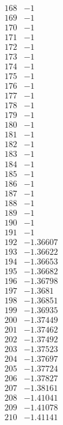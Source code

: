 \documentclass[12pt]{article}
\begin{document}
{$$\begin{array}{|r|r|}
\hline
168 & -1\\
\hline
169 & -1\\
\hline
170 & -1\\
\hline
171 & -1\\
\hline
172 & -1\\
\hline
173 & -1\\
\hline
174 & -1\\
\hline
175 & -1\\
\hline
176 & -1\\
\hline
177 & -1\\
\hline
178 & -1\\
\hline
179 & -1\\
\hline
180 & -1\\
\hline
181 & -1\\
\hline
182 & -1\\
\hline
183 & -1\\
\hline
184 & -1\\
\hline
185 & -1\\
\hline
186 & -1\\
\hline
187 & -1\\
\hline
188 & -1\\
\hline
189 & -1\\
\hline
190 & -1\\
\hline
191 & -1\\
\hline
192 & -1.36607\\
\hline
193 & -1.36622\\
\hline
194 & -1.36653\\
\hline
195 & -1.36682\\
\hline
196 & -1.36798\\
\hline
197 & -1.3681\\
\hline
198 & -1.36851\\
\hline
199 & -1.36935\\
\hline
200 & -1.37449\\
\hline
201 & -1.37462\\
\hline
202 & -1.37492\\
\hline
203 & -1.37523\\
\hline
204 & -1.37697\\
\hline
205 & -1.37724\\
\hline
206 & -1.37827\\
\hline
207 & -1.38161\\
\hline
208 & -1.41041\\
\hline
209 & -1.41078\\
\hline
210 & -1.41141\\

\end{array}$$}
\end{document}

